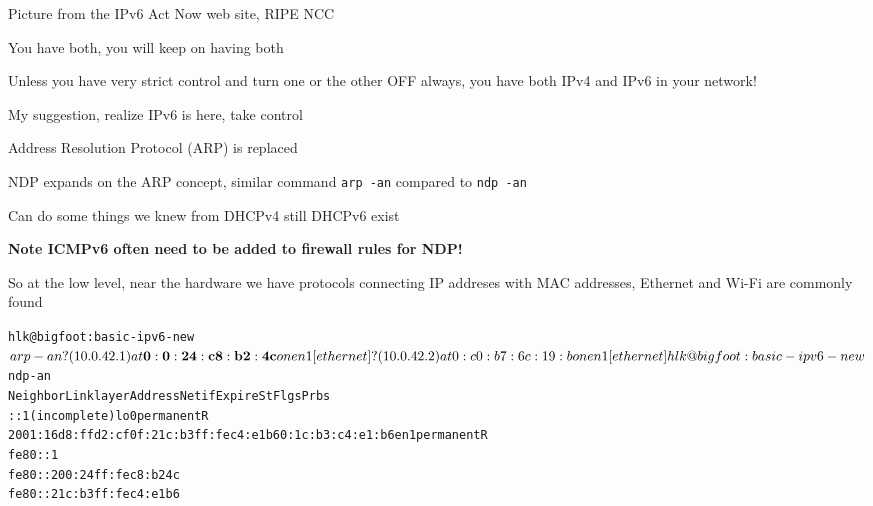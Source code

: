 \documentclass[Screen16to9,17pt]{foils}
\begin{document}

Picture from the IPv6 Act Now web site, RIPE NCC

\begin{list2}
\item You have both, you will keep on having both
\item Unless you have very strict control and turn one or the other OFF always, you have both IPv4 and IPv6 in your network!
\item My suggestion, realize IPv6 is here, take control
\end{list2}




\begin{list1}
\item Address Resolution Protocol (ARP) is replaced
\item NDP expands on the ARP concept, similar command \verb+arp -an+ compared to \verb+ndp -an+
\item Can do some things we knew from DHCPv4 still DHCPv6 exist
\item {\bf Note ICMPv6 often need to be added to firewall rules for NDP!} {\myalert}
\end{list1}


So at the low level, near the hardware we have protocols connecting IP addreses with MAC addresses, Ethernet and Wi-Fi are commonly found

\begin{alltt}
\small
hlk@bigfoot:basic-ipv6-new$ arp -an
? (10.0.42.1) at{\bf 0:0:24:c8:b2:4c} on en1 [ethernet]
? (10.0.42.2) at 0:c0:b7:6c:19:b on en1 [ethernet]

hlk@bigfoot:basic-ipv6-new$ ndp -an
Neighbor                      Linklayer Address  Netif Expire    St Flgs Prbs
::1                           (incomplete)         lo0 permanent R
2001:16d8:ffd2:cf0f:21c:b3ff:fec4:e1b6 0:1c:b3:c4:e1:b6 en1 permanent R
fe80::1%lo0                   (incomplete)         lo0 permanent R
fe80::200:24ff:fec8:b24c%en1 {\bf 0:0:24:c8:b2:4c}      en1 8h54m51s  S  R
fe80::21c:b3ff:fec4:e1b6%en1  0:1c:b3:c4:e1:b6     en1 permanent R
\end{alltt}

\end{document}

